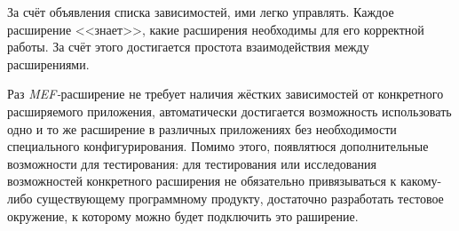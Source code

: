За счёт объявления списка зависимостей, ими легко управлять. Каждое расширение <<знает>>, какие расширения необходимы для его корректной работы. За счёт этого достигается простота взаимодействия между расширениями.

Раз {\it MEF-}расширение не требует наличия жёстких зависимостей от конкретного расширяемого приложения, автоматически достигается возможность использовать одно и то же расширение в различных приложениях без необходимости специального конфигурирования. Помимо этого, появлятюся дополнительные возможности для тестирования: для тестирования или исследования возможностей конкретного расширения не обязательно привязываться к какому-либо существующему программному продукту, достаточно разработать тестовое окружение, к которому можно будет подключить это раширение.
